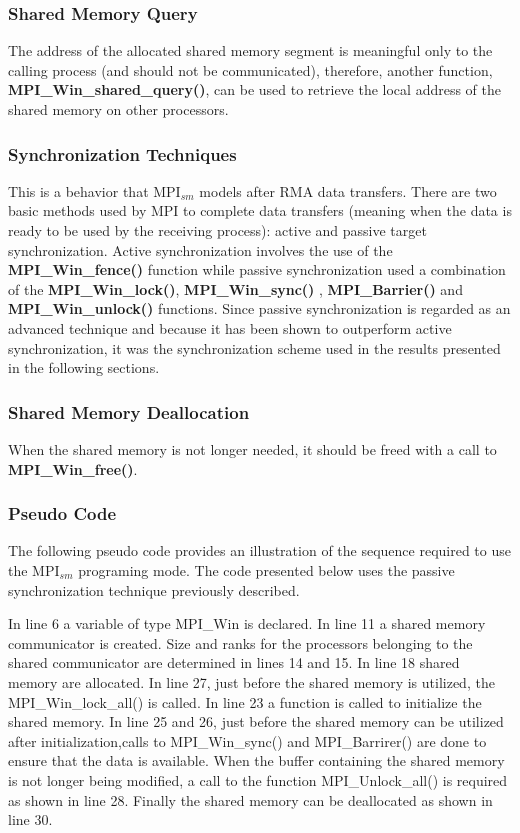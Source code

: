 \subsubsection*{Shared Memory Query}

The address of the allocated shared memory segment is meaningful only to the calling process (and should not be communicated), therefore, another function, \textbf{MPI\_Win\_shared\_query()}, can be used to retrieve the local address of the shared memory on other processors.

\subsubsection*{Synchronization Techniques}

This is a behavior that MPI$_{sm}$ models after RMA data transfers. There are two basic methods used by MPI to complete data transfers (meaning when the data is ready to be used by the receiving process): active and passive target synchronization. Active synchronization involves the use of the \textbf{MPI\_Win\_fence()} function while passive synchronization used a combination of the \textbf{MPI\_Win\_lock()}, \textbf{MPI\_Win\_sync()} ,  \textbf{MPI\_Barrier()} and  \textbf{MPI\_Win\_unlock()} functions. Since passive synchronization is regarded as an advanced technique and because it has been shown to outperform active synchronization, it was the synchronization scheme used in the results presented in the following sections.

\subsubsection*{Shared Memory Deallocation}
When the shared memory is not longer needed, it should be freed with a call to \textbf{MPI\_Win\_free()}.


\subsubsection*{Pseudo Code}

The following pseudo code provides an illustration of the sequence required to use the MPI$_{sm}$ programing mode. The code presented below uses the passive synchronization technique previously described.

In line 6 a variable of type MPI\_Win is declared. In line 11 a shared memory communicator is created. Size and ranks for the processors belonging to the shared communicator are determined in lines 14 and 15. In line 18  shared memory are allocated. In line 27, just before the shared memory is utilized, the MPI\_Win\_lock\_all() is called. In line 23 a function is called to initialize the shared memory. In line 25 and 26, just before the shared memory can be utilized after initialization,calls to MPI\_Win\_sync() and MPI\_Barrirer() are done to ensure that the data is available. When the buffer containing the shared memory is not longer being modified, a call to the function MPI\_Unlock\_all() is required as shown in line 28. Finally the shared memory can be deallocated as shown in line 30.

